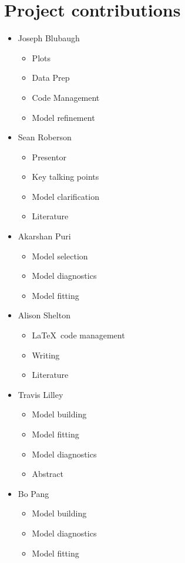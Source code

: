 \documentclass[twoside,twocolumn]{article}
\begin{document}
 \section*{Project contributions}
 \begin{itemize}
 	\item Joseph Blubaugh
 		\begin{itemize}
 			\item Plots
 			\item Data Prep
 			\item Code Management
 			\item Model refinement
 		\end{itemize}
 		
 	\item Sean Roberson
 	 		\begin{itemize}
 			\item Presentor
 			\item Key talking points
 			\item Model clarification
 			\item Literature
 		\end{itemize}
 	
	\item Akarshan Puri
			\begin{itemize}
 			\item Model selection
 			\item Model diagnostics
 			\item Model fitting
 		\end{itemize}
 	
 	\item Alison Shelton
 			\begin{itemize}
 				\item \LaTeX \ code management
 				\item Writing
 				\item Literature
 			\end{itemize}
	
	\item Travis Lilley
			 \begin{itemize}
			 \item Model building
			 \item Model fitting
			 \item Model diagnostics
			 \item Abstract
			 \end{itemize}

	\item{Bo Pang}
		\begin{itemize}
					\item Model building
		 			\item Model diagnostics
		 			\item Model fitting
		\end{itemize}
 \end{itemize}
\end{document}

